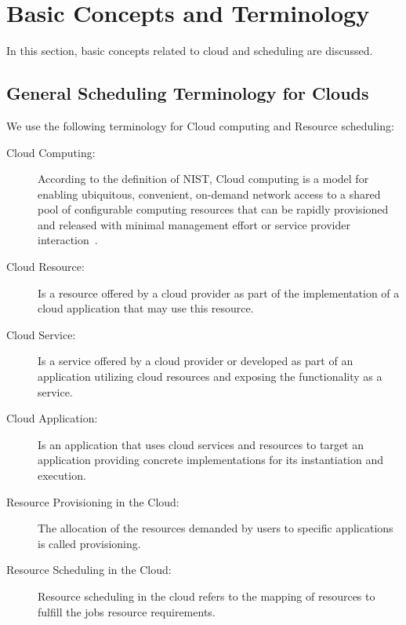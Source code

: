 \documentclass[final,5p,times,twocolumn]{elsarticle}
\begin{document}
\section{Basic Concepts and Terminology}\label{sec:terminology}
\color{red}
In this section, basic concepts related to cloud and scheduling are discussed. 



\color{black}
\subsection{General Scheduling Terminology for Clouds}

We use the following terminology for Cloud computing and Resource scheduling:

\begin{description}

\item[Cloud Computing:] According to the definition of NIST, Cloud computing
  is a model for enabling ubiquitous, convenient, on-demand network
  access to a shared pool of configurable computing resources that can
  be rapidly provisioned and released with minimal management effort
  or service provider interaction~\cite{mell2011nist}.

\item[Cloud Resource:] Is a resource offered by a cloud provider as
  part of the implementation of a cloud application that may use this
  resource.

\item[Cloud Service:] Is a service offered by a cloud provider or
  developed as part of an application utilizing cloud resources and
  exposing the functionality as a service.
  
\item[Cloud Application:] Is an application that uses cloud services
  and resources to target an application providing concrete
  implementations for its instantiation and execution.

\item [Resource Provisioning in the Cloud:] The allocation of the
  resources demanded by users to specific
  applications is called provisioning. 
  
\item [Resource Scheduling in the Cloud:] Resource scheduling in the
  cloud refers to the mapping of resources to fulfill the jobs
  resource requirements.

\end{description}
\end{document}
